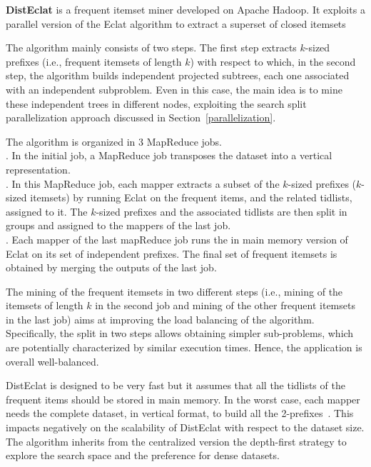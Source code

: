 {\bf DistEclat} is a frequent itemset miner developed on Apache Hadoop. It exploits
a parallel version of the Eclat algorithm to extract a superset of closed itemsets

The algorithm mainly consists of two steps. The first step extracts $k$-sized prefixes (i.e., frequent itemsets of length $k$) with respect to which, in
the second step, the algorithm builds independent projected subtrees, each one associated with an independent subproblem. Even in this case,
the main idea is to mine these independent trees in different nodes, exploiting the search split parallelization approach discussed in 
Section~\ref{parallelization}. 

The algorithm is organized in 3 MapReduce jobs. \\ 
. In the initial job, a MapReduce job transposes
the dataset into a vertical representation. \\
. In this MapReduce job, each mapper extracts a subset of the $k$-sized prefixes ($k$-sized itemsets)
by running Eclat on the frequent items, and the related tidlists, assigned to it. The $k$-sized prefixes and the associated tidlists are then split in groups and assigned to the mappers of the last job.  \\
. Each mapper of the last mapReduce job runs the in main memory version of Eclat 
on its set of independent prefixes. The final set of frequent itemsets is obtained by merging the outputs of the last job. 

The mining of the frequent itemsets in two different steps (i.e., mining of the itemsets of length $k$ in the second job and mining of the other frequent itemsets in the last job) aims at improving the load balancing of the algorithm. 
Specifically, the split in two steps allows obtaining simpler sub-problems, which are potentially characterized by similar execution times. Hence, the application is overall well-balanced.

DistEclat is designed to be very fast but it assumes that all the tidlists of the frequent items should be stored in main memory.
In the worst case, each mapper needs the complete dataset, in vertical format, to build all the 2-prefixes~\cite{bigfim}. This impacts 
negatively on the scalability of DistEclat with respect to the dataset size.
The algorithm inherits from the centralized version the depth-first strategy to
explore the search space and the preference for dense datasets.

